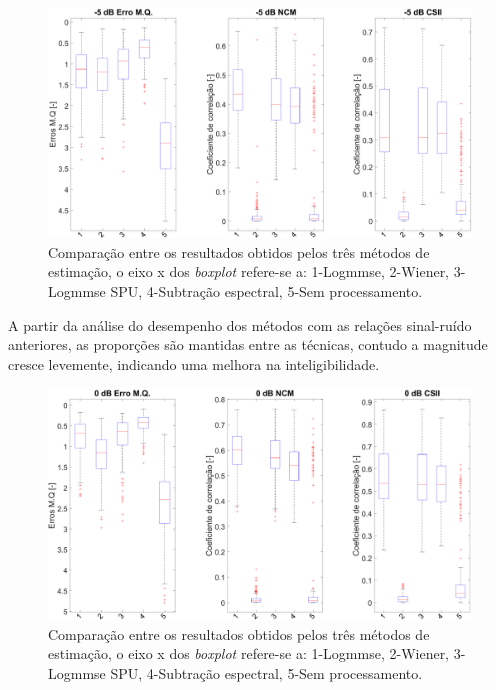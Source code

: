 \begin{figure}[H]
\centering
\includegraphics[width=1\linewidth]{Figs/int_m5}
\caption{Comparação entre os resultados obtidos pelos três métodos de estimação, o eixo x dos \textit{boxplot} refere-se a: 1-Logmmse, 2-Wiener, 3-Logmmse SPU, 4-Subtração espectral, 5-Sem processamento.}
\label{i2}
\end{figure}

A partir da análise do desempenho dos métodos com as relações sinal-ruído anteriores, as proporções são mantidas entre as técnicas, contudo a magnitude cresce levemente, indicando uma melhora na inteligibilidade. 

\begin{figure}[H]
\centering
\includegraphics[width=1\linewidth]{Figs/int_0}
\caption{Comparação entre os resultados obtidos pelos três métodos de estimação, o eixo x dos \textit{boxplot} refere-se a: 1-Logmmse, 2-Wiener, 3-Logmmse SPU, 4-Subtração espectral, 5-Sem processamento.}
\label{i3}
\end{figure}

